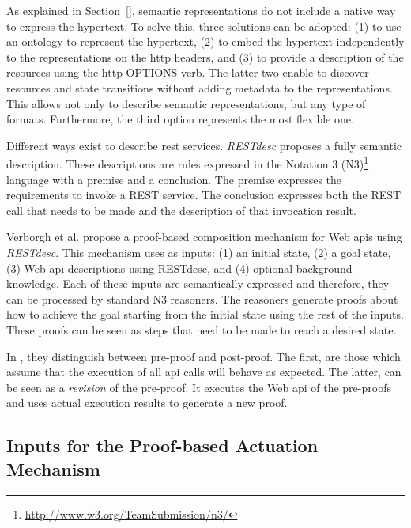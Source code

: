 As explained in Section~\ref{}, semantic representations do not include a native way to express the hypertext.
To solve this, three solutions can be adopted:
(1) to use an ontology to represent the hypertext,
(2) to embed the hypertext independently to the representations on the \ac{http} headers, and %
(3) to provide a description of the resources using the \ac{http} OPTIONS verb.
The latter two enable to discover resources and state transitions without adding metadata to the representations.
This allows not only to describe semantic representations, but any type of formats.
Furthermore, the third option represents the most flexible one.


Different ways exist to describe \ac{rest} services. %
\emph{RESTdesc} \cite{verborgh_wsrest_2012} proposes a fully semantic description.
These descriptions are rules expressed in the Notation 3 (N3)\footnote{\url{http://www.w3.org/TeamSubmission/n3/}} language with a premise and a conclusion.
The premise expresses the requirements to invoke a REST service.
The conclusion expresses both the REST call that needs to be made and the description of that invocation result.


Verborgh et al. \cite{verborgh_ijcs_2014} propose a proof-based composition mechanism for Web \acp{api} using \emph{RESTdesc}.
This mechanism uses as inputs:
(1) an initial state,
(2) a goal state,
(3) Web \ac{api} descriptions using RESTdesc, and
(4) optional background knowledge.
Each of these inputs are semantically expressed and therefore, they can be processed by standard N3 reasoners.
The reasoners generate proofs about how to achieve the goal starting from the initial state using the rest of the inputs.
These proofs can be seen as steps that need to be made to reach a desired state.


In \cite{verborgh_ijcs_2014}, they distinguish between pre-proof and post-proof.
The first, are those which assume that the execution of all \acs{api} calls will behave as expected.
The latter, can be seen as a \emph{revision} of the pre-proof.
It executes the Web \acs{api} of the pre-proofs and uses actual execution results to generate a new proof.



\subsection{Inputs for the Proof-based Actuation Mechanism}
\label{sec:inputs_proof}

